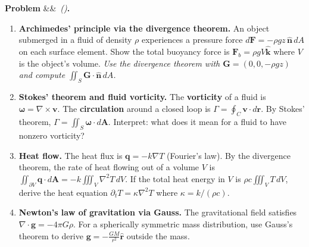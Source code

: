 \documentclass[12pt,a4paper]{article}
\newcounter{problem}
\newenvironment{problem}[1][]{\refstepcounter{problem}\par\vspace{6pt}\noindent\textbf{\color{MidBlue}Problem \theproblem}\ifx&#1&\else\ \textit{(#1)}\fi\textbf{.}\enskip}{\par\vspace{4pt}}
\begin{document}
\begin{problem}
\label{prob:applications}
\begin{enumerate}[label=(\alph*),topsep=2pt]
  \item \textbf{Archimedes' principle via the divergence theorem.} An object submerged in a fluid of density $\rho$ experiences a pressure force $d\mathbf{F} = -\rho g z\,\hat{\mathbf{n}}\,dA$ on each surface element. Show the total buoyancy force is $\mathbf{F}_b = \rho g V\hat{\mathbf{k}}$ where $V$ is the object's volume. \textit{Use the divergence theorem with $\mathbf{G}=(0,0,-\rho gz)$ and compute $\iint_S\mathbf{G}\cdot\hat{\mathbf{n}}\,dA$.}
  \item \textbf{Stokes' theorem and fluid vorticity.} The \textbf{vorticity} of a fluid is $\boldsymbol{\omega}=\nabla\times\mathbf{v}$. The \textbf{circulation} around a closed loop is $\Gamma=\oint_C\mathbf{v}\cdot d\mathbf{r}$. By Stokes' theorem, $\Gamma = \iint_S\boldsymbol{\omega}\cdot d\mathbf{A}$. Interpret: what does it mean for a fluid to have nonzero vorticity?
  \item \textbf{Heat flow.} The heat flux is $\mathbf{q} = -k\nabla T$ (Fourier's law). By the divergence theorem, the rate of heat flowing out of a volume $V$ is $\iint_{\partial V}\mathbf{q}\cdot d\mathbf{A} = -k\iiint_V\nabla^2 T\,dV$. If the total heat energy in $V$ is $\rho c\iiint_V T\,dV$, derive the heat equation $\partial_t T = \kappa\nabla^2 T$ where $\kappa=k/(\rho c)$.
  \item \textbf{Newton's law of gravitation via Gauss.} The gravitational field satisfies $\nabla\cdot\mathbf{g} = -4\pi G\rho$. For a spherically symmetric mass distribution, use Gauss's theorem to derive $\mathbf{g} = -\frac{GM}{r^2}\hat{\mathbf{r}}$ outside the mass.
\end{enumerate}
\end{problem}
\end{document}
